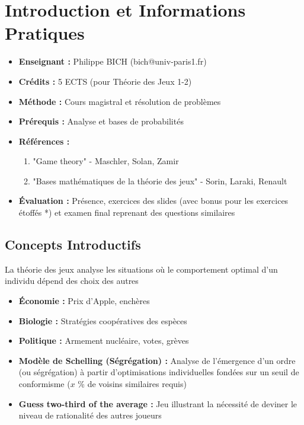 % 


\section{Introduction et Informations Pratiques} %

\begin{itemize}
    \item \textbf{Enseignant :} Philippe BICH (bich@univ-paris1.fr) %
    \item \textbf{Crédits :} 5 ECTS (pour Théorie des Jeux 1-2) %
    \item \textbf{Méthode :} Cours magistral et résolution de problèmes %
    \item \textbf{Prérequis :} Analyse et bases de probabilités %
    \item \textbf{Références :} 
        \begin{enumerate}
            \item "Game theory" - Maschler, Solan, Zamir %
            \item "Bases mathématiques de la théorie des jeux" - Sorin, Laraki, Renault %
        \end{enumerate}
    \item \textbf{Évaluation :} Présence, exercices des slides (avec bonus pour les exercices étoffés *) et examen final reprenant des questions similaires %
\end{itemize}

\subsection{Concepts Introductifs} %
La théorie des jeux analyse les situations où le comportement optimal d'un individu dépend des choix des autres %
\begin{itemize}
    \item \textbf{Économie :} Prix d'Apple, enchères %
    \item \textbf{Biologie :} Stratégies coopératives des espèces %
    \item \textbf{Politique :} Armement nucléaire, votes, grèves %
    \item \textbf{Modèle de Schelling (Ségrégation) :} Analyse de l'émergence d'un ordre (ou ségrégation) à partir d'optimisations individuelles fondées sur un seuil de conformisme ($x$ \% de voisins similaires requis) %
    \item \textbf{Guess two-third of the average :} Jeu illustrant la nécessité de deviner le niveau de rationalité des autres joueurs %
\end{itemize}

